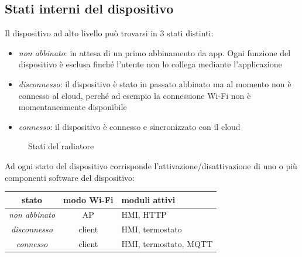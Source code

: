 \documentclass[12pt,a4paper,twoside,titlepage]{book}
\begin{document}
\subsection{Stati interni del dispositivo}

Il dispositivo ad alto livello può trovarsi in 3 stati distinti:

\begin{itemize}
    \item \textit{non abbinato}: in attesa di un primo abbinamento da app. Ogni funzione del
        dispositivo è esclusa finché l'utente non lo collega mediante l'applicazione
    \item \textit{disconnesso}: il dispositivo è stato in passato abbinato ma al momento non è
        connesso al cloud, perché ad esempio la connessione Wi-Fi non è momentaneamente disponibile
    \item \textit{connesso}: il dispositivo è connesso e sincronizzato con il cloud
\end{itemize}

\begin{figure}[ht]
    \centering
    \caption{Stati del radiatore}
    \label{fig:stati}
\end{figure}

Ad ogni stato del dispositivo corrisponde l'attivazione/disattivazione di uno o più
componenti software del dispositivo:

\begin{center}
\begin{tabular}{| c | c | l |}
    \hline
    stato & modo Wi-Fi & moduli attivi \\
    \hline
    \textit{non abbinato} & AP & HMI, HTTP \\
    \hline
    \textit{disconnesso} & client & HMI, termostato \\
    \hline
    \textit{connesso} & client & HMI, termostato, MQTT \\
    \hline
\end{tabular}
\end{center}
\end{document}
